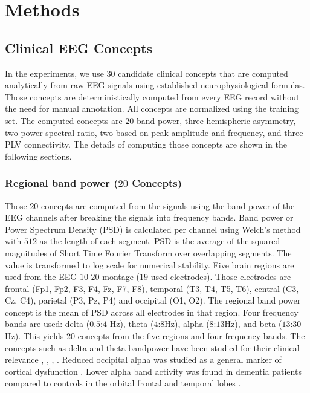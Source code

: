 \documentclass[journal,twoside,web]{ieeecolor}
\begin{document}
\section{Methods}
\subsection{Clinical EEG Concepts}
\label{sec:concepts}

In the experiments, we use $30$ candidate clinical concepts that are computed analytically from raw EEG signals using established neurophysiological formulas. Those concepts are deterministically computed from every EEG record without the need for manual annotation. All concepts are normalized using the training set. The computed concepts are $20$ band power, three hemispheric asymmetry, two power spectral ratio, two based on peak amplitude and frequency, and three PLV connectivity. The details of computing those concepts are shown in the following sections.


\subsubsection{Regional band power ($20$ Concepts)}
\hfill \break
Those $20$ concepts are computed from the signals using the band power of the EEG channels after breaking the signals into frequency bands. Band power or Power Spectrum Density (PSD) is calculated per channel using Welch's method \cite{welch1967} with $512$ as the length of each segment. PSD is the average of the squared magnitudes of Short Time Fourier Transform over overlapping segments. The value is transformed to log scale for numerical stability. Five brain regions are used from the EEG $10$-$20$ montage ($19$ used electrodes). Those electrodes are frontal (Fp1, Fp2, F3, F4, Fz, F7, F8), temporal (T3, T4, T5, T6), central (C3, Cz, C4), parietal (P3, Pz, P4) and occipital (O1, O2). The regional band power concept is the mean of PSD across all electrodes in that region. Four frequency bands are used: delta ($0.5$:$4$ Hz), theta ($4$:$8$Hz), alpha ($8$:$13$Hz), and beta ($13$:$30$Hz). This yields $20$ concepts from the five regions and four frequency bands. The concepts such as delta and theta bandpower have been studied for their clinical relevance \cite{niedermeyer2011}, \cite{lin2021differences}, \cite{nardone2018usefulness}, \cite{tomasello2023neuropsychological}. Reduced occipital alpha was studied as a general marker of cortical dysfunction \cite{klimesch1999}. Lower alpha band activity was found in dementia patients compared to controls in the orbital frontal and temporal lobes \cite{nishida2011differences}. 
\end{document}
